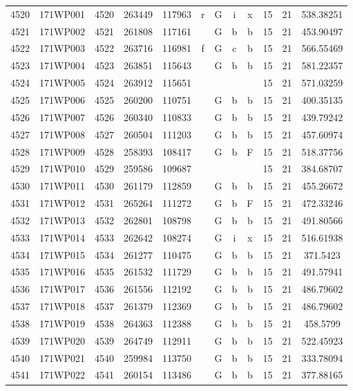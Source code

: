 \begin{tabular}{|*{12}{c|}}
4520 & 171WP001 & 4520 & 263449 & 117963 & r & G & i & x & 15 & 21 & 538.38251 \\ 
4521 & 171WP002 & 4521 & 261808 & 117161 &  & G & b & b & 15 & 21 & 453.90497 \\ 
4522 & 171WP003 & 4522 & 263716 & 116981 & f & G & c & b & 15 & 21 & 566.55469 \\ 
4523 & 171WP004 & 4523 & 263851 & 115643 &  & G & b & b & 15 & 21 & 581.22357 \\ 
4524 & 171WP005 & 4524 & 263912 & 115651 &  &  &  &  & 15 & 21 & 571.03259 \\ 
4525 & 171WP006 & 4525 & 260200 & 110751 &  & G & b & b & 15 & 21 & 400.35135 \\ 
4526 & 171WP007 & 4526 & 260340 & 110833 &  & G & b & b & 15 & 21 & 439.79242 \\ 
4527 & 171WP008 & 4527 & 260504 & 111203 &  & G & b & b & 15 & 21 & 457.60974 \\ 
4528 & 171WP009 & 4528 & 258393 & 108417 &  & G & b & F & 15 & 21 & 518.37756 \\ 
4529 & 171WP010 & 4529 & 259586 & 109687 &  &  &  &  & 15 & 21 & 384.68707 \\ 
4530 & 171WP011 & 4530 & 261179 & 112859 &  & G & b & b & 15 & 21 & 455.26672 \\ 
4531 & 171WP012 & 4531 & 265264 & 111272 &  & G & b & F & 15 & 21 & 472.33246 \\ 
4532 & 171WP013 & 4532 & 262801 & 108798 &  & G & b & b & 15 & 21 & 491.80566 \\ 
4533 & 171WP014 & 4533 & 262642 & 108274 &  & G & i & x & 15 & 21 & 516.61938 \\ 
4534 & 171WP015 & 4534 & 261277 & 110475 &  & G & b & b & 15 & 21 & 371.5423 \\ 
4535 & 171WP016 & 4535 & 261532 & 111729 &  & G & b & b & 15 & 21 & 491.57941 \\ 
4536 & 171WP017 & 4536 & 261556 & 112192 &  & G & b & b & 15 & 21 & 486.79602 \\ 
4537 & 171WP018 & 4537 & 261379 & 112369 &  & G & b & b & 15 & 21 & 486.79602 \\ 
4538 & 171WP019 & 4538 & 264363 & 112388 &  & G & b & b & 15 & 21 & 458.5799 \\ 
4539 & 171WP020 & 4539 & 264749 & 112911 &  & G & b & b & 15 & 21 & 522.45923 \\ 
4540 & 171WP021 & 4540 & 259984 & 113750 &  & G & b & b & 15 & 21 & 333.78094 \\ 
4541 & 171WP022 & 4541 & 260154 & 113486 &  & G & b & b & 15 & 21 & 377.88165 \\ 

\end{tabular}
